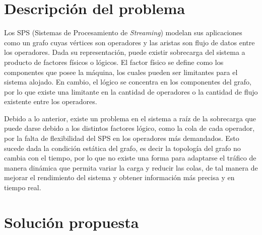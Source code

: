 \section{Descripción del problema}
\label{intro:problema}


Los SPS (Sistemas de Procesamiento de \textit{Streaming}) modelan sus aplicaciones como un grafo cuyas vértices son operadores y las aristas son flujo de datos entre los operadores. Dada su representación, puede existir sobrecarga del sistema a producto de factores físicos o lógicos. El factor físico se define como los componentes que posee la máquina, los cuales pueden ser limitantes para el sistema alojado. En cambio, el lógico se concentra en los componentes del grafo, por lo que existe una limitante en la cantidad de operadores o la cantidad de flujo existente entre los operadores.


Debido a lo anterior, existe un problema en el sistema a raíz de la sobrecarga que puede darse debido a los distintos factores lógico, como la cola de cada operador, por la falta de flexibilidad del SPS en los operadores más demandados. Esto sucede dada la condición estática del grafo, es decir la topología del grafo no cambia con el tiempo, por lo que no existe una forma para adaptarse el tráfico de manera dinámica que permita variar la carga y reducir las colas, de tal manera de mejorar el rendimiento del sistema y obtener información más precisa y en tiempo real.

\section{Solución propuesta}
\label{intro:solucion}

